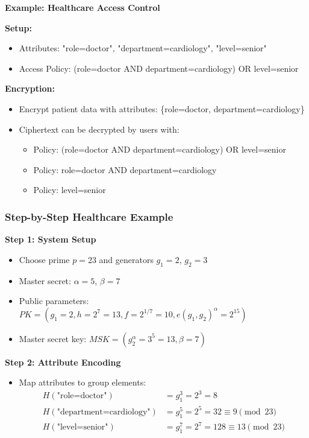 \documentclass[11pt,a4paper]{article}
\begin{document}
\begin{examplebox}
\textbf{Example: Healthcare Access Control}

\textbf{Setup:}
\begin{itemize}
    \item Attributes: "role=doctor", "department=cardiology", "level=senior"
    \item Access Policy: (role=doctor AND department=cardiology) OR level=senior
\end{itemize}

\textbf{Encryption:}
\begin{itemize}
    \item Encrypt patient data with attributes: \{role=doctor, department=cardiology\}
    \item Ciphertext can be decrypted by users with:
    \begin{itemize}
        \item Policy: (role=doctor AND department=cardiology) OR level=senior
        \item Policy: role=doctor AND department=cardiology
        \item Policy: level=senior
    \end{itemize}
\end{itemize}
\end{examplebox}

\subsubsection{Step-by-Step Healthcare Example}

\begin{mathbox}
\textbf{Step 1: System Setup}
\begin{itemize}
    \item Choose prime $p = 23$ and generators $g_1 = 2$, $g_2 = 3$
    \item Master secret: $\alpha = 5$, $\beta = 7$
    \item Public parameters: $PK = (g_1 = 2, h = 2^7 = 13, f = 2^{1/7} = 10, e(g_1, g_2)^\alpha = 2^{15})$
    \item Master secret key: $MSK = (g_2^\alpha = 3^5 = 13, \beta = 7)$
\end{itemize}
\end{mathbox}

\begin{mathbox}
\textbf{Step 2: Attribute Encoding}
\begin{itemize}
    \item Map attributes to group elements:
    \begin{align*}
    H(\text{"role=doctor"}) &= g_1^3 = 2^3 = 8 \\
    H(\text{"department=cardiology"}) &= g_1^5 = 2^5 = 32 \equiv 9 \pmod{23} \\
    H(\text{"level=senior"}) &= g_1^7 = 2^7 = 128 \equiv 13 \pmod{23}
    \end{align*}
\end{itemize}
\end{mathbox}
\end{document}
